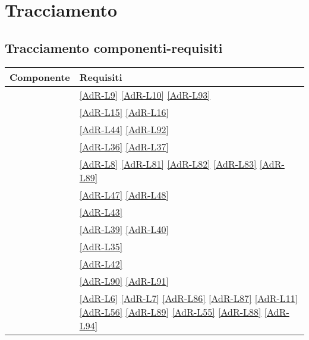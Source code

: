\section{Tracciamento}
\subsection{Tracciamento componenti-requisiti}
\begin{longtable}{|P{6cm}|P{6cm}|}
	\hline \textbf{Componente} & \textbf{Requisiti} \\ 
	\endfirsthead
	\hline {} & \ref{AdR-L9} \linebreak \ref{AdR-L10} \linebreak \ref{AdR-L93} \\
	\hline {} & \ref{AdR-L15} \linebreak \ref{AdR-L16} \\
	\hline {} & \ref{AdR-L44} \linebreak \ref{AdR-L92} \\
	\hline {} & \ref{AdR-L36} \linebreak \ref{AdR-L37} \\
	\hline {} & \ref{AdR-L8} \linebreak \ref{AdR-L81} \linebreak \ref{AdR-L82} \linebreak \ref{AdR-L83} \linebreak \ref{AdR-L89} \\
	\hline {} & \ref{AdR-L47} \linebreak \ref{AdR-L48} \\
	\hline {} & \ref{AdR-L43} \\
	\hline {} & \ref{AdR-L39} \linebreak \ref{AdR-L40} \\
	\hline {} & \ref{AdR-L35} \\
	\hline {} & \ref{AdR-L42} \\
	\hline {} & \ref{AdR-L90} \linebreak \ref{AdR-L91} \\
	\hline {} & \ref{AdR-L6} \linebreak \ref{AdR-L7} \linebreak \ref{AdR-L86} \linebreak \ref{AdR-L87} \linebreak \ref{AdR-L11} \linebreak \ref{AdR-L56} \linebreak \ref{AdR-L89} \linebreak \ref{AdR-L55} \linebreak \ref{AdR-L88} \linebreak \ref{AdR-L94} \\

\end{longtable}

